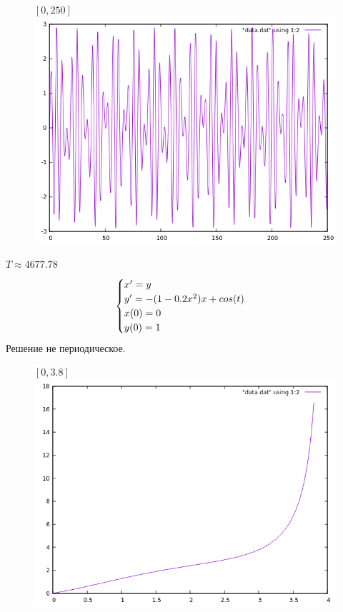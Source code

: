 \documentclass[12pt, a4paper] {article}
\theoremstyle{remark}
\theoremstyle{definition}
\begin{document}
\newpage
\begin{figure}[h!]
$[0, 250]$ \\
\centering
\includegraphics[width=1\linewidth]{solve_plus_250.png} 
\end{figure}
$T \approx 4677.78$
\newpage
\begin{gather}
\begin{cases}
\notag x' = y \\
\notag y' = -(1 - 0.2x^2)x + cos(t) \\
\notag x(0) = 0 \\
\notag y(0) = 1
\end{cases}
\end{gather}
Решение не периодическое.
\begin{figure}[h!]
$[0, 3.8]$ \\
\centering
\includegraphics[width=1\linewidth]{min_3.png} 
\end{figure}
\end{document}
